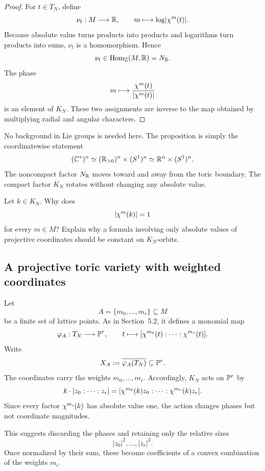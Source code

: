 \begin{proof}
For \(t\in T_N\), define
\[
\nu_t:M\longrightarrow\mathbb{R},
\qquad
m\longmapsto\log\lvert\chi^{m}(t)\rvert.
\]
Because absolute value turns products into products and logarithms turn
products into sums, \(\nu_t\) is a homomorphism. Hence
\[
\nu_t\in\operatorname{Hom}_{\mathbb{Z}}(M,\mathbb{R})=N_{\mathbb{R}}.
\]
The phase
\[
m\longmapsto
\frac{\chi^{m}(t)}{\lvert\chi^{m}(t)\rvert}
\]
is an element of \(K_N\). These two assignments are inverse to the map
obtained by multiplying radial and angular characters.
\end{proof}

\begin{observation}
No background in Lie groups is needed here. The proposition is simply
the coordinatewise statement
\[
(\mathbb{C}^*)^n
\simeq
(\mathbb{R}_{>0})^n\times(S^1)^n
\simeq
\mathbb{R}^n\times(S^1)^n.
\]
The noncompact factor \(N_{\mathbb{R}}\) moves toward and away from the toric
boundary. The compact factor \(K_N\) rotates without changing any
absolute value.
\end{observation}

\begin{pauseandthink}
Let \(k\in K_N\). Why does
\[
\lvert\chi^{m}(k)\rvert=1
\]
for every \(m\in M\)? Explain why a formula involving only absolute
values of projective coordinates should be constant on \(K_N\)-orbits.
\end{pauseandthink}

\subsection{A projective toric variety with weighted coordinates}

Let
\[
A=\{m_0,\dots,m_r\}\subseteq M
\]
be a finite set of lattice points. As in Section~5.2,
it defines a monomial map
\[
\varphi_A:T_N\longrightarrow\mathbb{P}^r,
\qquad
t\longmapsto
[\chi^{m_0}(t):\cdots:\chi^{m_r}(t)].
\]
Write
\[
X_A:=\overline{\varphi_A(T_N)}\subseteq\mathbb{P}^r.
\]
The coordinates carry the weights \(m_0,\dots,m_r\). Accordingly,
\(K_N\) acts on \(\mathbb{P}^r\) by
\[
k\cdot[z_0:\cdots:z_r]
=
[\chi^{m_0}(k)z_0:\cdots:\chi^{m_r}(k)z_r].
\]
Since every factor \(\chi^{m_i}(k)\) has absolute value one, the
action changes phases but not coordinate magnitudes.

This suggests discarding the phases and retaining only the relative
sizes
\[
\lvert z_0\rvert^2,\dots,\lvert z_r\rvert^2.
\]
Once normalized by their sum, these become coefficients of a convex
combination of the weights \(m_i\).

